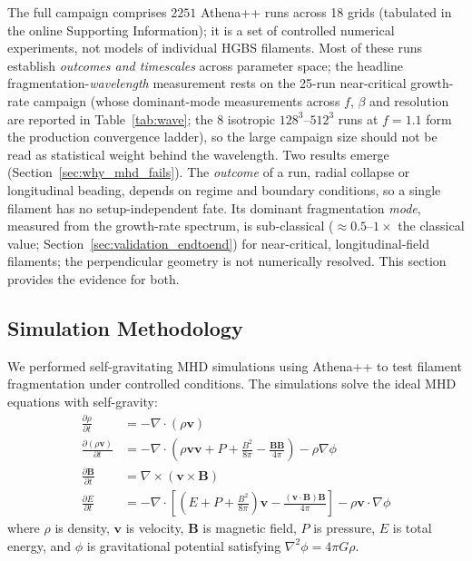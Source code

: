 \documentclass[usenatbib,twoside,twocolumn]{mnras}
\begin{document}
The full campaign comprises $2251$ Athena++ runs across 18 grids (tabulated in the online Supporting Information); it is a set of controlled numerical experiments, not models of individual HGBS filaments. Most of these runs establish \emph{outcomes and timescales} across parameter space; the headline fragmentation-\emph{wavelength} measurement rests on the 25-run near-critical growth-rate campaign (whose dominant-mode measurements across $f$, $\beta$ and resolution are reported in Table~\ref{tab:wave}; the 8 isotropic $128^3$--$512^3$ runs at $f=1.1$ form the production convergence ladder), so the large campaign size should not be read as statistical weight behind the wavelength. Two results emerge (Section~\ref{sec:why_mhd_fails}). The \emph{outcome} of a run, radial collapse or longitudinal beading, depends on regime and boundary conditions, so a single filament has no setup-independent fate. Its dominant fragmentation \emph{mode}, measured from the growth-rate spectrum, is sub-classical ($\approx0.5$--$1\times$ the classical value; Section~\ref{sec:validation_endtoend}) for near-critical, longitudinal-field filaments; the perpendicular geometry is not numerically resolved. This section provides the evidence for both.

\subsection{Simulation Methodology}

We performed self-gravitating MHD simulations using Athena++ \citep{Stone2020} to test filament fragmentation under controlled conditions. The simulations solve the ideal MHD equations with self-gravity:
\begin{align}
\frac{\partial \rho}{\partial t} &= -\nabla \cdot (\rho \mathbf{v}) \\
\frac{\partial (\rho \mathbf{v})}{\partial t} &= -\nabla \cdot \left(\rho \mathbf{v} \mathbf{v} + P + \frac{B^2}{8\pi} - \frac{\mathbf{B}\mathbf{B}}{4\pi}\right) - \rho \nabla \phi \\
\frac{\partial \mathbf{B}}{\partial t} &= \nabla \times (\mathbf{v} \times \mathbf{B}) \\
\frac{\partial E}{\partial t} &= -\nabla \cdot \left[(E + P + \frac{B^2}{8\pi})\mathbf{v} - \frac{(\mathbf{v} \cdot \mathbf{B})\mathbf{B}}{4\pi}\right] - \rho \mathbf{v} \cdot \nabla \phi
\end{align}
where $\rho$ is density, $\mathbf{v}$ is velocity, $\mathbf{B}$ is magnetic field, $P$ is pressure, $E$ is total energy, and $\phi$ is gravitational potential satisfying $\nabla^2 \phi = 4\pi G\rho$.
\end{document}
